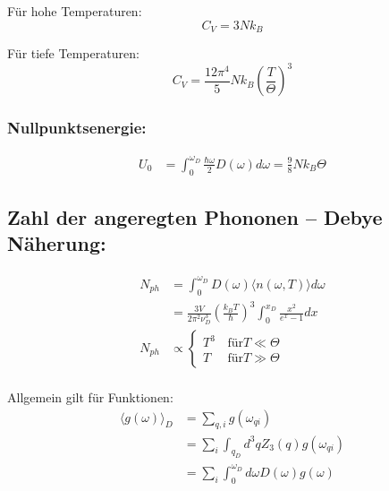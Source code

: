 Für hohe Temperaturen: 
\begin{equation*}
    C_V = 3N k_B
\end{equation*}

Für tiefe Temperaturen:
\begin{equation*}
    C_V = \frac{12 \pi^4}{5} N k_B \left(\frac{T}{\Theta}\right)^3
\end{equation*}

\subsubsection*{Nullpunktsenergie:}
\begin{equation*}
    \begin{aligned}
        U_0 &= \int_0^{\omega_D} \frac{\hbar \omega}{2} D(\omega) d\omega = \frac{9}{8} N k_B \Theta
    \end{aligned}
\end{equation*}

\subsection*{Zahl der angeregten Phononen – Debye Näherung:}
\begin{equation*}
    \begin{aligned}
        N_{ph} &= \int_0^{\omega_D} D(\omega) \langle n (\omega,T) \rangle d\omega \\ 
        &= \frac{3V}{2 \pi^2 \nu_D^3} \left(\frac{k_B T}{\hbar}\right)^3 \int_0^{x_D} \frac{x^2}{e^x -1}dx \\
        N_{ph} &\propto \begin{cases}
            T^3 & \, \text{für} T \ll \Theta \\
            T &  \, \text{für} T \gg \Theta
            \end{cases} \\
    \end{aligned}
\end{equation*}

Allgemein gilt für Funktionen:
\begin{equation*}
    \begin{aligned}
        \langle g(\omega) \rangle_D &= \sum_{q,i} g(\omega_{qi}) \\
           &= \sum_i \int_{q_D} d^3 q Z_3(q) g(\omega_{qi}) \\
           &= \sum_i \int_0^{\omega_D} d\omega D(\omega) g(\omega)
    \end{aligned}
\end{equation*}


